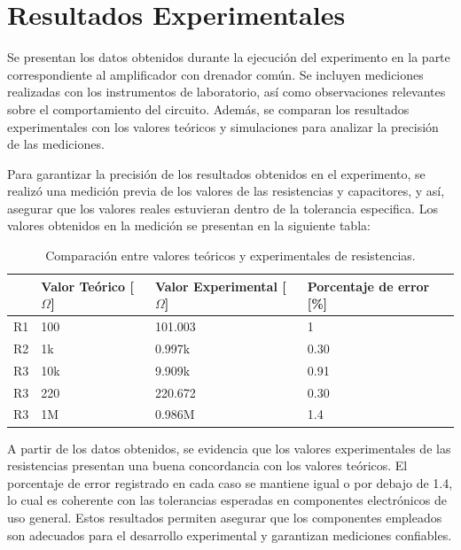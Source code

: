 \documentclass[journal]{IEEEtran}
\begin{document}
\section{Resultados Experimentales}
\par Se presentan los datos obtenidos durante la ejecución del experimento en la parte correspondiente al amplificador con drenador común. Se incluyen mediciones realizadas con los instrumentos de laboratorio, así como observaciones relevantes sobre el comportamiento del circuito. Además, se comparan los resultados experimentales con los valores teóricos y simulaciones para analizar la precisión de las mediciones.
\par Para garantizar la precisión de los resultados obtenidos en el experimento, se realizó una medición previa de los valores de las resistencias y capacitores, y así, asegurar que los valores reales estuvieran dentro de la tolerancia especifica. Los valores obtenidos en la medición se presentan en la siguiente tabla:
\begin{table}[h]
    \caption{Comparación entre valores teóricos y experimentales de resistencias.}
    \centering
    \renewcommand{\arraystretch}{1.2} %
    \begin{tabular}{|l|p{2cm}|p{2cm}|p{2cm}|}
        \hline
        & \textbf{Valor Teórico [$\Omega$]} & \textbf{Valor Experimental [$\Omega$]} & \textbf{Porcentaje de error [\%]} \\
        \hline
        R1 & 100  & 101.003  & 1 \\
        \hline
        R2 & 1k   & 0.997k  & 0.30 \\
        \hline
        R3 & 10k & 9.909k & 0.91 \\
        \hline
        R3 & 220 & 220.672 & 0.30 \\
        \hline
        R3 & 1M & 0.986M & 1.4 \\
        \hline
    \end{tabular}
    \label{tab:resistencias}
\end{table}
\par A partir de los datos obtenidos, se evidencia que los valores experimentales de las resistencias presentan una buena concordancia con los valores teóricos. El porcentaje de error registrado en cada caso se mantiene igual o por debajo de 1.4, lo cual es coherente con las tolerancias esperadas en componentes electrónicos de uso general. Estos resultados permiten asegurar que los componentes empleados son adecuados para el desarrollo experimental y garantizan mediciones confiables.
\end{document}
